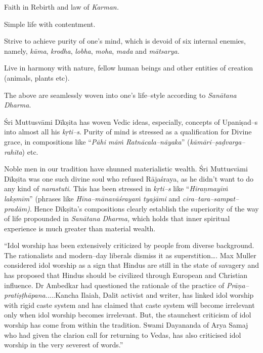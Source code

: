  \item Faith in Rebirth and law of \textit{Karman.}

 \item Simple life with contentment.

 \item Strive to achieve purity of one’s mind, which is devoid of six internal enemies, namely, \textit{kāma}, \textit{krodha}, \textit{lobha}, \textit{moha}, \textit{mada} and \textit{mātsarya.}

 \item Live in harmony with nature, fellow human beings and other entities of creation (animals, plants etc).

The above are seamlessly woven into one’s life–style according to \textit{Sanātana Dharma}.

Śri Muttusvāmi Dīkṣita has woven Vedic ideas, especially, concepts of Upaniṣad–s into almost all his \textit{kṛti–s}. Purity of mind is stressed as a qualification for Divine grace, in compositions like “\textit{Pāhi māṁ Ratnācala–nāyaka}” (\textit{kāmāri–ṣaḍvarga–rahita}) etc.

Noble men in our tradition have shunned materialistic wealth. Śri Muttusvāmi Dīkṣita was one such divine soul who refused Rājaśraya, as he didn’t want to do any kind of \textit{narastuti}. This has been stressed in \textit{kṛti–s} like “\textit{Hiraṇmayīṁ lakṣmīm}” (phrases like \textit{Hīna–mānavāśrayaṁ tyajāmi} and \textit{cira–tara–sampat–pradām)}. Hence Dīkṣita’s compositions clearly establish the superiority of the way of life propounded in \textit{Sanātana Dharma,} which holds that inner spiritual experience is much greater than material wealth.

\begin{myquote}
“Idol worship has been extensively criticized by people from diverse background. The rationalists and modern–day liberals dismiss it as superstition…. Max Muller considered idol worship as a sign that Hindus are still in the state of savagery and has proposed that Hindus should be civilized through European and Christian influence. Dr Ambedkar had questioned the rationale of the practice of \textit{Prāṇa–pratiṣṭhāpana}.....Kancha Ilaiah, Dalit activist and writer, has linked idol worship with rigid caste system and has claimed that caste system will become irrelevant only when idol worship becomes irrelevant. But, the staunchest criticism of idol worship has come from within the tradition. Swami Dayananda of Arya Samaj who had given the clarion call for returning to Vedas, has also criticised idol worship in the very severest of words.”
\end{myquote}

